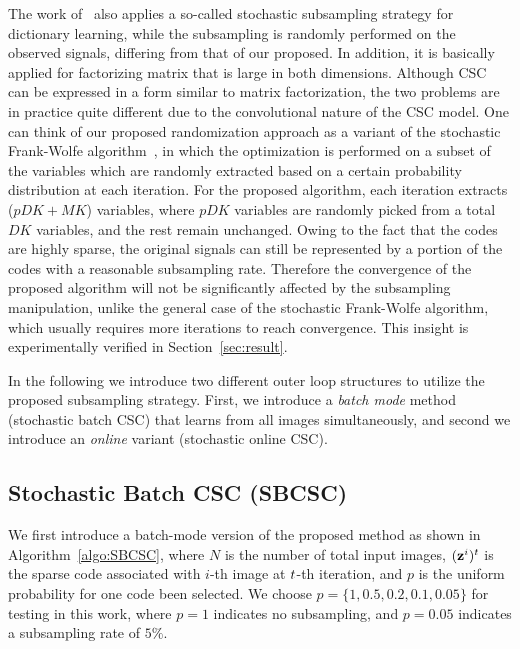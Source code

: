 The work of~\cite{mensch2016dictionary} also applies a so-called
stochastic subsampling strategy for dictionary learning, while the
subsampling is randomly performed on the observed signals, differing
from that of our proposed. In addition, it is basically applied for
factorizing matrix that is large in both dimensions. Although CSC can
be expressed in a form similar to matrix factorization, the two
problems are in practice quite different due to the convolutional
nature of the CSC model.  One can think of our proposed randomization
approach as a variant of the stochastic Frank-Wolfe
algorithm~\cite{reddi2016stochastic,pmlr-v80-kerdreux18a}, in which
the optimization is performed on a subset of the variables which are
randomly extracted based on a certain probability distribution at each
iteration. For the proposed algorithm, each iteration extracts
($pDK+MK$) variables, where $pDK$ variables are randomly picked from a
total $DK$ variables, and the rest remain unchanged. Owing to the fact
that the codes are highly sparse, the original signals can still be
represented by a portion of the codes with a reasonable subsampling
rate. Therefore the convergence of the proposed algorithm will not be
significantly affected by the subsampling manipulation, unlike the
general case of the stochastic Frank-Wolfe algorithm, which usually
requires more iterations to reach convergence. This insight is
experimentally verified in Section~\ref{sec:result}.

In the following we introduce two different outer loop structures to
utilize the proposed subsampling strategy. First, we introduce a {\em
  batch mode} method (stochastic batch CSC) that learns from all
images simultaneously, and second we introduce an {\em online}
variant (stochastic online CSC).

\subsection{Stochastic Batch CSC (SBCSC)}
We first introduce a batch-mode version of the proposed method as
shown in Algorithm~\ref{algo:SBCSC}, where $N$ is the number of total
input images, $(\code^i)^{\ite}$ is the sparse code associated with $i$-th
image at $t$-th iteration, and $p$ is the uniform probability for one code been
selected. We choose $p=\{1, 0.5, 0.2, 0.1, 0.05\}$ for testing in this
work, where $p=1$ indicates no subsampling, and $p=0.05$ indicates a
subsampling rate of $5\%$.

